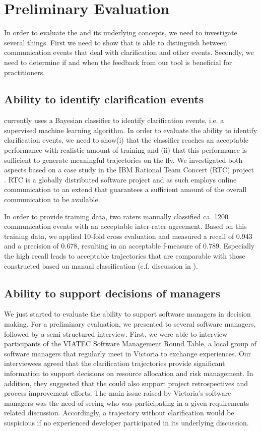 \section{Preliminary Evaluation}
In order to evaluate the \viss and its underlying concepts, we need to investigate several things.
First we need to show that \viss is able to distinguish between communication events that deal with clarification and other events. 
Secondly, we need to determine if and when the feedback from our \viss tool is beneficial for practitioners. 

\subsection{Ability to identify clarification events}
\viss currently uses a Bayesian classifier to identify clarification events, i.e. a supervised machine learning algorithm.
In order to evaluate the ability to identify clarification events, we need to show(i)  that the classifier reaches an acceptable performance with realistic amount of training and (ii) that this performance is sufficient to generate meaningful trajectories on the fly.
We investigated both aspects based on a case study in the IBM Rational Team Concert (RTC) project \cite{Knauss2012f}.
RTC is a globally distributed software project and as such employs online communication to an extend that guarantees a sufficient amount of the overall communication to be available.

In order to provide training data, two raters manually classified ca. 1200 communication events with an acceptable inter-rater agreement.  
Based on this training data, we applied 10-fold cross evaluation and measured a recall of 0.943 and a precision of  0.678, resulting in an acceptable f-measure of 0.789.
Especially the high recall leads to acceptable trajectories that are comparable with those constructed based on manual classification (c.f. discussion in \cite{Knauss2012f}).

\subsection{Ability to support decisions of managers}
We just started to evaluate the ability to support software managers in decision making. 
For a preliminary evaluation, we presented \viss to several software managers, followed by a semi-structured interview.
First, we were able to interview participants of the VIATEC Software Management Round Table, a local group of software managers that regularly meet in Victoria to exchange experiences.
Our interviewees agreed that the clarification trajectories provide significant information to support decisions on resource allocation and risk management. 
In addition, they suggested that the \viss could also support project retrospectives and process improvement efforts. 
The main issue raised by Victoria's software managers was the need of seeing who was participating in a given requirements related discussion. 
Accordingly, a trajectory without clarification would be suspicious if no experienced developer participated in its underlying discussion. 


